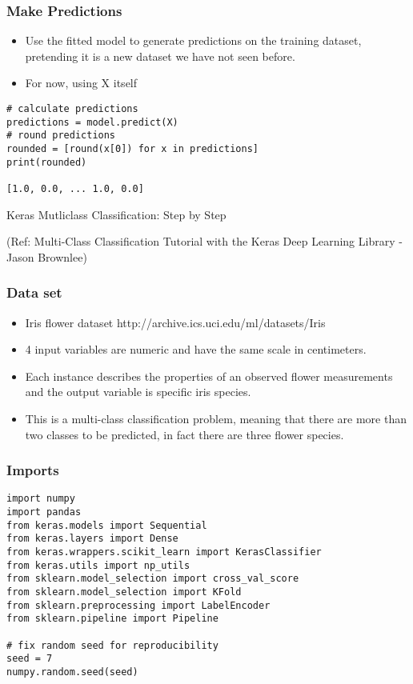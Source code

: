 \begin{frame}[fragile] \frametitle{Make Predictions}
 \begin{itemize}
\item Use the fitted model to generate predictions on the training dataset, pretending it is a new dataset we have not seen before.
\item For now, using X itself
\end{itemize}
\begin{lstlisting}
# calculate predictions
predictions = model.predict(X)
# round predictions
rounded = [round(x[0]) for x in predictions]
print(rounded)

[1.0, 0.0, ... 1.0, 0.0]
\end{lstlisting}
\end{frame}


\begin{frame}
  \begin{center}
    {\Large Keras Mutliclass Classification: Step by Step}
    
    \tiny{(Ref:  Multi-Class Classification Tutorial with the Keras Deep Learning Library - Jason Brownlee)}
  \end{center}
\end{frame}


\begin{frame}[fragile] \frametitle{Data set}
 \begin{itemize}
 \item  Iris flower dataset http://archive.ics.uci.edu/ml/datasets/Iris
 \item  4 input variables are numeric and have the same scale in centimeters. 
 \item Each instance describes the properties of an observed flower measurements and the output variable is specific iris species.
 \item This is a multi-class classification problem, meaning that there are more than two classes to be predicted, in fact there are three flower species.
\end{itemize}
\end{frame}

\begin{frame}[fragile] \frametitle{Imports}
\begin{lstlisting}
import numpy
import pandas
from keras.models import Sequential
from keras.layers import Dense
from keras.wrappers.scikit_learn import KerasClassifier
from keras.utils import np_utils
from sklearn.model_selection import cross_val_score
from sklearn.model_selection import KFold
from sklearn.preprocessing import LabelEncoder
from sklearn.pipeline import Pipeline

# fix random seed for reproducibility
seed = 7
numpy.random.seed(seed)
\end{lstlisting}
\end{frame}


